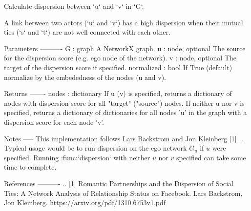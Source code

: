 \begin{DoxyVerb}Calculate dispersion between `u` and `v` in `G`.

A link between two actors (`u` and `v`) has a high dispersion when their
mutual ties (`s` and `t`) are not well connected with each other.

Parameters
----------
G : graph
    A NetworkX graph.
u : node, optional
    The source for the dispersion score (e.g. ego node of the network).
v : node, optional
    The target of the dispersion score if specified.
normalized : bool
    If True (default) normalize by the embededness of the nodes (u and v).

Returns
-------
nodes : dictionary
    If u (v) is specified, returns a dictionary of nodes with dispersion
    score for all "target" ("source") nodes. If neither u nor v is
    specified, returns a dictionary of dictionaries for all nodes 'u' in the
    graph with a dispersion score for each node 'v'.

Notes
-----
This implementation follows Lars Backstrom and Jon Kleinberg [1]_. Typical
usage would be to run dispersion on the ego network $G_u$ if $u$ were
specified.  Running :func:`dispersion` with neither $u$ nor $v$ specified
can take some time to complete.

References
----------
.. [1] Romantic Partnerships and the Dispersion of Social Ties:
    A Network Analysis of Relationship Status on Facebook.
    Lars Backstrom, Jon Kleinberg.
    https://arxiv.org/pdf/1310.6753v1.pdf\end{DoxyVerb}
 